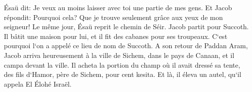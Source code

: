 \verse Ésaü dit: Je veux au moins laisser avec toi une partie de mes gens. Et Jacob répondit: Pourquoi cela? Que je trouve seulement grâce aux yeux de mon seigneur! 
\verse Le même jour, Ésaü reprit le chemin de Séir. 
\verse Jacob partit pour Succoth. Il bâtit une maison pour lui, et il fit des cabanes pour ses troupeaux. C`est pourquoi l`on a appelé ce lieu de nom de Succoth. 
\verse A son retour de Paddan Aram, Jacob arriva heureusement à la ville de Sichem, dans le pays de Canaan, et il campa devant la ville. 
\verse Il acheta la portion du champ où il avait dressé sa tente, des fils d`Hamor, père de Sichem, pour cent kesita. 
\verse Et là, il éleva un autel, qu`il appela El Élohé Israël. 

